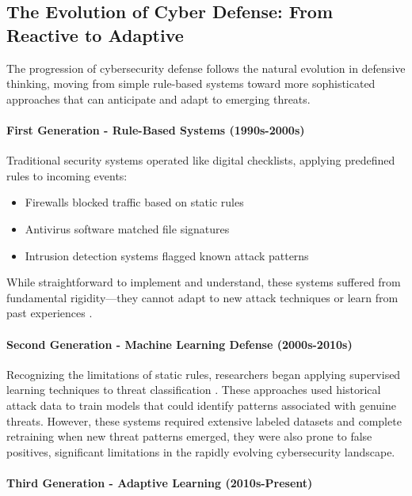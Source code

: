 \documentclass[12pt,oneside]{article}
\begin{document}
\subsection{The Evolution of Cyber Defense: From Reactive to Adaptive}

The progression of cybersecurity defense follows the natural evolution in defensive thinking, moving from simple rule-based systems toward more sophisticated approaches that can anticipate and adapt to emerging threats.

\paragraph{First Generation - Rule-Based Systems (1990s-2000s)}

Traditional security systems operated like digital checklists, applying predefined rules to incoming events\cite{alpcan2010network}:
\begin{itemize}
    \item Firewalls blocked traffic based on static rules
    \item Antivirus software matched file signatures
    \item Intrusion detection systems flagged known attack patterns
\end{itemize}
While straightforward to implement and understand, these systems suffered from fundamental rigidity—they cannot adapt to new attack techniques or learn from past experiences \cite{sommer2010outside}.

\paragraph{Second Generation - Machine Learning Defense (2000s-2010s)}

Recognizing the limitations of static rules, researchers began applying supervised learning techniques to threat classification \cite{sommer2010outside}. These approaches used historical attack data to train models that could identify patterns associated with genuine threats. 
However, these systems required extensive labeled datasets and complete retraining when new threat patterns emerged, they  were also prone to false positives, significant limitations in the rapidly evolving cybersecurity landscape.

\paragraph{Third Generation - Adaptive Learning (2010s-Present)}
\end{document}
